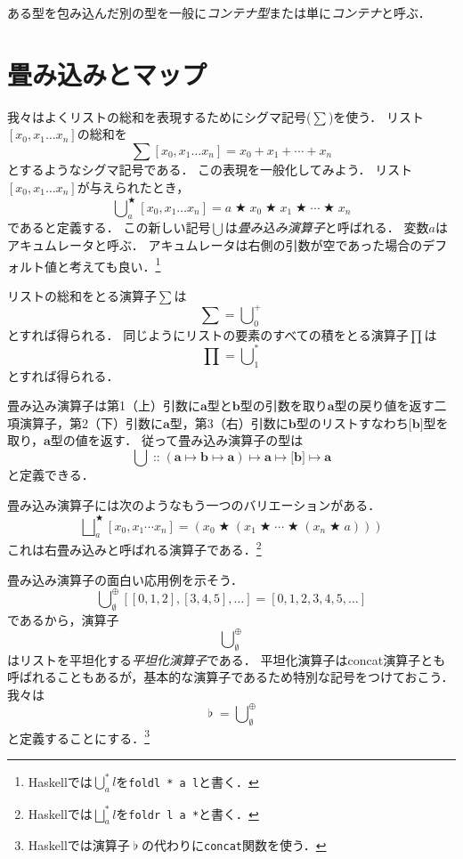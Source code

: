 \documentclass[twocolumn]{jsbook}
\newcommand{\keyword}[1]{\emph{#1}}
\newcommand{\code}[1]{\texttt{#1}}
\newcommand{\hsklType}[1]{\textbf{#1}}
\DeclareMathOperator{\hsklConcat}{\flat}
\newcommand{\hsklAppend}{\oplus}
\newcommand{\hsklEmptyList}{\emptyset}
\newcommand{\hsklListType}[1]{\boldsymbol{[}#1\boldsymbol{]}}
\DeclareMathOperator{\mathAnyBinaryOperator}{\bigstar}
\DeclareMathOperator{\mathIn}{::}
\DeclareMathOperator*{\mathFold}{\bigcup}
\DeclareMathOperator*{\mathFoldRight}{\bigsqcup}
\DeclareMathOperator{\mathMapsTo}{\mapsto}
\newcommand{\mathMorphII}[3]{#1\mathMapsTo#2\mathMapsTo#3}
\newcommand{\mathMorphIII}[4]{#1\mathMapsTo#2\mathMapsTo#3\mathMapsTo#4}
\begin{document}
ある型を包み込んだ別の型を一般に\keyword{コンテナ型}または単に\keyword{コンテナ}と呼ぶ．

\section{畳み込みとマップ}

我々はよくリストの総和を表現するためにシグマ記号($\sum$)を使う．
リスト$[x_0,x_1\dots x_n]$の総和を$$\sum[x_0,x_1\dots x_n]=x_0+x_1+\dotsb+x_n$$とするようなシグマ記号である．
この表現を一般化してみよう．
リスト$[x_0,x_1\dots x_n]$が与えられたとき，$$\mathFold^{\mathAnyBinaryOperator}_{a}[x_0,x_1\dots x_n]=a\mathAnyBinaryOperator x_0\mathAnyBinaryOperator x_1\mathAnyBinaryOperator\dotsb\mathAnyBinaryOperator x_n$$であると定義する．
この新しい記号$\mathFold$は\keyword{畳み込み演算子}と呼ばれる．
変数$a$はアキュムレータと呼ぶ．
アキュムレータは右側の引数が空であった場合のデフォルト値と考えても良い．\footnote{Haskellでは$\mathFold^{*}_{a}l$を\code{foldl * a l}と書く．}

リストの総和をとる演算子$\sum$は$$\sum=\mathFold^+_0$$とすれば得られる．
同じようにリストの要素のすべての積をとる演算子$\prod$は$$\prod=\mathFold^*_1$$とすれば得られる．

畳み込み演算子は第1（上）引数に$\hsklType{a}$型と$\hsklType{b}$型の引数を取り$\hsklType{a}$型の戻り値を返す二項演算子，第2（下）引数に$\hsklType{a}$型，第3（右）引数に$\hsklType{b}$型のリストすなわち$\hsklListType{\hsklType{b}}$型を取り，$\hsklType{a}$型の値を返す．
従って畳み込み演算子の型は$$\mathFold\mathIn\mathMorphIII{(\mathMorphII{\hsklType{a}}{\hsklType{b}}{\hsklType{a}})}{\hsklType{a}}{\hsklListType{\hsklType{b}}}{\hsklType{a}}$$と定義できる．

畳み込み演算子には次のようなもう一つのバリエーションがある．
$$\mathFoldRight^{\mathAnyBinaryOperator}_{a}[x_0,x_1\dotsb x_n]=\left(x_0\mathAnyBinaryOperator\left(x_1\mathAnyBinaryOperator\dotsb\mathAnyBinaryOperator\left(x_n\mathAnyBinaryOperator a\right)\right)\right)$$
これは右畳み込みと呼ばれる演算子である．\footnote{Haskellでは$\mathFoldRight^{*}_{a}l$を\code{foldr l a *}と書く．}

畳み込み演算子の面白い応用例を示そう．
$$\mathFold_\hsklEmptyList^\hsklAppend[[0,1,2],[3,4,5],\dots]=[0,1,2,3,4,5,\dots]$$
であるから，演算子$$\mathFold_\hsklEmptyList^\hsklAppend$$はリストを平坦化する\keyword{平坦化演算子}である．
平坦化演算子はconcat演算子とも呼ばれることもあるが，基本的な演算子であるため特別な記号をつけておこう．
我々は$$\hsklConcat=\mathFold_\hsklEmptyList^\hsklAppend$$と定義することにする．\footnote{Haskellでは演算子$\hsklConcat$の代わりに\code{concat}関数を使う．}
\end{document}
